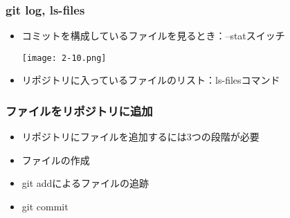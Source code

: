 \documentclass[dvipdfmx,11pt,notheorems]{beamer}
\begin{document}
\begin{frame}
\frametitle{git log, ls-files}
\begin{itemize}
\item コミットを構成しているファイルを見るとき：--statスイッチ
\begin{center}
\texttt{[image: 2-10.png]}
\end{center}
\item リポジトリに入っているファイルのリスト：ls-filesコマンド
\end{itemize}
\end{frame}

\begin{frame}
\frametitle{ファイルをリポジトリに追加}
\begin{itemize}
\item リポジトリにファイルを追加するには3つの段階が必要
\vspace{\baselineskip}
\item ファイルの作成
\item git addによるファイルの追跡
\item git commit
\end{itemize}
\end{frame}
\end{document}
